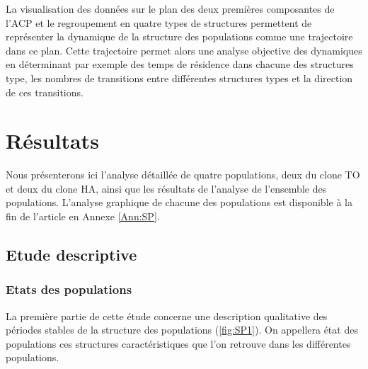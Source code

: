 La visualisation des données sur le plan des deux premières composantes de l'ACP
et le regroupement en quatre types de structures permettent de représenter la
dynamique de la structure des populations comme une trajectoire dans ce plan.
Cette trajectoire permet alors une analyse objective des dynamiques en
déterminant par exemple des temps de résidence dans chacune des structures type,
les nombres de transitions entre différentes structures types et la direction de
ces transitions. 

\section{Résultats}

Nous présenterons ici l'analyse détaillée de quatre populations, deux du clone
TO et deux du clone HA, ainsi que les résultats de l'analyse de l'ensemble des
populations. L'analyse graphique de chacune des populations est disponible à la
fin de l'article en Annexe \ref{Ann:SP}. 

\subsection{Etude descriptive}

\subsubsection{Etats des populations}

La première partie de cette étude concerne une description qualitative des
périodes stables de la structure des populations (\ref{fig:SP1}). On appellera
état des populations ces structures caractéristiques que l'on retrouve dans les
différentes populations. 

